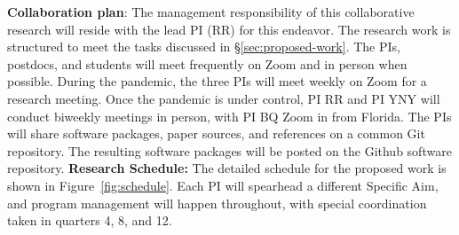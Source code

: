 \smallskip

\textbf{Collaboration plan}: 
%
The management responsibility of this collaborative research will reside
with the lead PI (RR) for this endeavor. The research work is structured
to meet the tasks discussed in \S\ref{sec:proposed-work}. The PIs,
postdocs, and students will meet frequently on Zoom and in person when
possible. During the pandemic, the three PIs will meet weekly on Zoom
for a research meeting. Once the pandemic is under control, PI RR and PI
YNY will conduct biweekly meetings in person, with PI BQ Zoom in from
Florida. The PIs will share software packages, paper sources, and
references on a common \textsf{Git} repository. The resulting software
packages will be posted on the \textsf{Github} software repository.
%
%
\textbf{Research Schedule:} The detailed schedule for the proposed work
is shown in Figure~\ref{fig:schedule}. Each PI will spearhead a
different Specific Aim, and program management will happen
throughout, with special coordination taken in quarters 4, 8, and
12.


